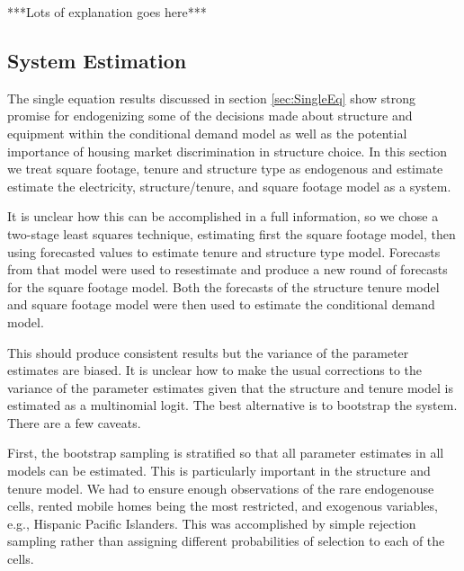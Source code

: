 \documentclass{article}
\begin{document}
% 
% 
% 

***Lots of explanation goes here***




  \subsection{System Estimation}

The single equation results discussed in section \ref{sec:SingleEq} show strong promise for endogenizing some of the decisions made about structure and equipment within the conditional demand model as well as the potential importance of housing market discrimination in structure choice.  In this section we treat square footage, tenure and structure type as endogenous and estimate estimate the electricity, structure/tenure, and square footage model as a system.

It is unclear how this can be accomplished in a full information, so we chose a two-stage least squares technique, estimating first the square footage model, then using forecasted values to estimate tenure and structure type model.  Forecasts from that model were used to resestimate and produce a new round of forecasts for the square footage model.  Both the forecasts of the structure tenure model and square footage model were then used to estimate the conditional demand model.

This should produce consistent results but the variance of the parameter estimates are biased.  It is unclear how to make the usual corrections to the variance of the parameter estimates given that the structure and tenure model is estimated as a multinomial logit.  The best alternative is to bootstrap the system.  There are a few caveats.

First, the bootstrap sampling is stratified so that all parameter estimates in all models can be estimated.  This is particularly important in the structure and tenure model.  We had to ensure enough observations of the rare endogenouse cells, rented mobile homes being the most restricted, and exogenous variables, e.g., Hispanic Pacific Islanders.  This was accomplished by simple rejection sampling rather than assigning different probabilities of selection to each of the cells.
\end{document}
